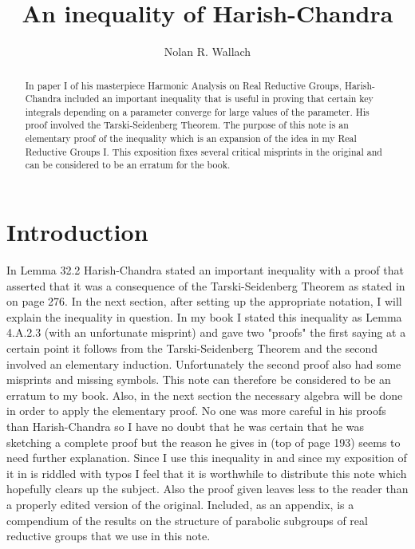 \documentclass[12pt]{article}%
\begin{document}
\title{An inequality of Harish-Chandra}
\author{Nolan R. Wallach}
\maketitle

\begin{abstract}
In paper I of his masterpiece Harmonic Analysis on Real Reductive Groups,
Harish-Chandra included an important inequality that is useful in proving that
certain key integrals depending on a parameter converge for large values of
the parameter. His proof involved the Tarski-Seidenberg Theorem. The purpose
of this note is an elementary proof of the inequality which is an expansion of
the idea in my Real Reductive Groups I. This exposition fixes several critical
misprints in the original and can be considered to be an erratum for the book. \ 

\end{abstract}

\section{Introduction}

In \cite{Plancherel1} Lemma 32.2 Harish-Chandra stated an important inequality
with a proof that asserted that it was a consequence of the Tarski-Seidenberg
Theorem as stated in \cite{Hor1} on page 276. In the next section, after
setting up the appropriate notation, I will explain the inequality in
question. In my book \cite{RRGI} I stated this inequality as Lemma 4.A.2.3
(with an unfortunate misprint) and gave two "proofs" the first saying at a
certain point it follows from the Tarski-Seidenberg Theorem and the second
involved an elementary induction. Unfortunately the second proof also had some
misprints and missing symbols. This note can therefore be considered to be an
erratum to my book. Also, in the next section the necessary algebra will be
done in order to apply the elementary proof. No one was more careful in his
proofs than Harish-Chandra so I have no doubt that he was certain that he was
sketching a complete proof but the reason he gives in \cite{Plancherel1} (top
of page 193) seems to need further explanation. Since I use this inequality in
\cite{WPT} and since my exposition of it in \cite{RRGI} is riddled with typos
I feel that it is worthwhile to distribute this note which hopefully clears up
the subject. Also the proof given leaves less to the reader than a properly
edited version of the original. Included, as an appendix, is a compendium of
the results on the structure of parabolic subgroups of real reductive groups
that we use in this note.
\end{document}
